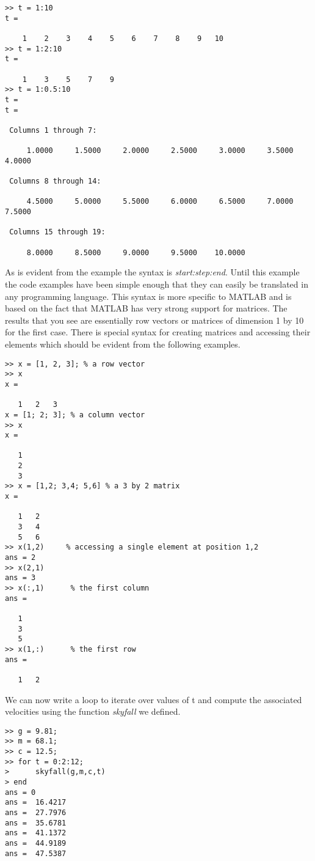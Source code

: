\documentclass [titlepage,12pt,letter] {article}
\begin{document}
\begin{verbatim} 
>> t = 1:10
t =

    1    2    3    4    5    6    7    8    9   10
>> t = 1:2:10
t =

    1    3    5    7    9
>> t = 1:0.5:10 
t = 
t =

 Columns 1 through 7:

     1.0000     1.5000     2.0000     2.5000     3.0000     3.5000     4.0000

 Columns 8 through 14:

     4.5000     5.0000     5.5000     6.0000     6.5000     7.0000     7.5000

 Columns 15 through 19:

     8.0000     8.5000     9.0000     9.5000    10.0000
\end{verbatim} 
\noindent 
As is evident from the example the syntax is {\it
  start:step:end}. Until this example the code examples have been
simple enough that they can easily be translated in any programming
language. This syntax is more specific to MATLAB and is based on the
fact that MATLAB has very strong support for matrices. The results
that you see are essentially row vectors or matrices of dimension 1 by
10 for the first case. There is special syntax for creating matrices and 
accessing their elements which should be evident from the following examples. 

\begin{verbatim} 
>> x = [1, 2, 3]; % a row vector 
>> x 
x =

   1   2   3
x = [1; 2; 3]; % a column vector 
>> x 
x =

   1
   2
   3
>> x = [1,2; 3,4; 5,6] % a 3 by 2 matrix  
x =

   1   2
   3   4
   5   6
>> x(1,2)     % accessing a single element at position 1,2  
ans = 2 
>> x(2,1) 
ans = 3
>> x(:,1)      % the first column 
ans =

   1
   3
   5
>> x(1,:)      % the first row 
ans =

   1   2
\end{verbatim} 

We can now write a loop to iterate over values of t and compute the
associated velocities using the function {\it skyfall} we defined.

\begin{verbatim} 
>> g = 9.81;
>> m = 68.1;
>> c = 12.5;
>> for t = 0:2:12; 
>      skyfall(g,m,c,t) 
> end
ans = 0
ans =  16.4217
ans =  27.7976
ans =  35.6781
ans =  41.1372
ans =  44.9189
ans =  47.5387
\end{verbatim} 
\end{document}
